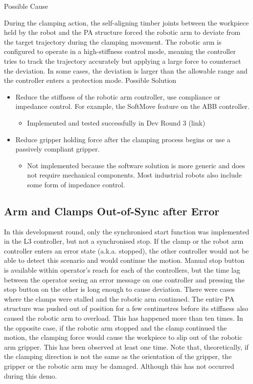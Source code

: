 Possible Cause

During the clamping action, the self-aligning timber joints between the workpiece held by the robot and the PA structure forced the robotic arm to deviate from the target trajectory during the clamping movement. The robotic arm is configured to operate in a high-stiffness control mode, meaning the controller tries to track the trajectory accurately but applying a large force to counteract the deviation. In some cases, the deviation is larger than the allowable range and the controller enters a protection mode.
Possible Solution
\begin{itemize}
    \item Reduce the stiffness of the robotic arm controller, use compliance or impedance control. For example, the SoftMove feature on the ABB controller.
    \begin{itemize}
        \item Implemented and tested successfully in Dev Round 3 (link)
    \end{itemize}
    \item Reduce gripper holding force after the clamping process begins or use a passively compliant gripper.
    \begin{itemize}
        \item Not implemented because the software solution is more generic and does not require mechanical components. Most industrial robots also include some form of impedance control.
    \end{itemize}
\end{itemize}

\subsection{Arm and Clamps Out-of-Sync after Error}
In this development round, only the synchronised start function was implemented in the L3 controller, but not a synchronised stop. If the clamp or the robot arm controller enters an error state (a.k.a. stopped), the other controller would not be able to detect this scenario and would continue the motion. Manual stop button is available within operator’s reach for each of the controllers, but the time lag between the operator seeing an error message on one controller and pressing the stop button on the other is long enough to cause deviation.
There were cases where the clamps were stalled and the robotic arm continued. The entire PA structure was pushed out of position for a few centimetres before its stiffness also caused the robotic arm to overload. This has happened more than ten times.
In the opposite case, if the robotic arm stopped and the clamp continued the motion, the clamping force would cause the workpiece to slip out of the robotic arm gripper. This has been observed at least one time.
Note that, theoretically, if the clamping direction is not the same as the orientation of the gripper, the gripper or the robotic arm may be damaged. Although this has not occurred during this demo.

